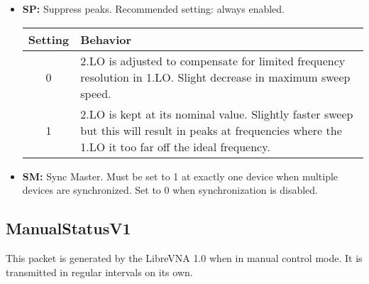 \documentclass[a4paper,11pt]{article}
\begin{document}
\begin{itemize}
\begin{center}
\begin{tabularx}{\textwidth}{ c|X }
\end{tabularx}
\end{center}
\item \textbf{SP:} Suppress peaks. Recommended setting: always enabled.
\begin{center}
\begin{tabularx}{\textwidth}{ c|X }
Setting & Behavior\\
 \hline
0 & 2.LO is adjusted to compensate for limited frequency resolution in 1.LO. Slight decrease in maximum sweep speed. \\
1 & 2.LO is kept at its nominal value. Slightly faster sweep but this will result in peaks at frequencies where the 1.LO it too far off the ideal frequency. \\
\end{tabularx}
\end{center}
\item \textbf{SM:} Sync Master. Must be set to 1 at exactly one device when multiple devices are synchronized. Set to 0 when synchronization is disabled.
\end{itemize}

\subsection{ManualStatusV1}
This packet is generated by the LibreVNA 1.0 when in manual control mode. It is transmitted in regular intervals on its own.
\end{document}
